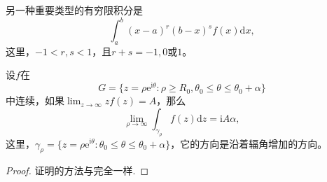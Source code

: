 \documentclass[../../main.tex]{subfiles}%
\begin{document}
另一种重要类型的有穷限积分是
\[
\int_{a}^{b} (x - a)^r (b - x)^s f(x) \mathrm{d}x,
\]
这里，\( -1 < r, s < 1 \)，且\( r + s = -1, 0 \)或\( 1 \)。

\begin{lemma}\label{lemma:引理5.5.15}
设\( f \)在
\[
G = \{ z = \rho \mathrm{e}^{\mathrm{i}\theta} : \rho \geqslant R_0, \theta_0 \leqslant \theta \leqslant \theta_0 + \alpha \}
\]
中连续，如果\(\lim_{z \to \infty} z f(z) = A\)，那么
\[
\lim_{\rho \to \infty} \int_{\gamma_{\rho}} f(z) \mathrm{d}z = \mathrm{i}A\alpha,
\]
这里，\(\gamma_{\rho} = \{ z = \rho \mathrm{e}^{\mathrm{i}\theta} : \theta_0 \leqslant \theta \leqslant \theta_0 + \alpha \}\)，它的方向是沿着辐角增加的方向。
\end{lemma}
\begin{proof}

证明的方法与完全一样.

\end{proof}
\end{document}
